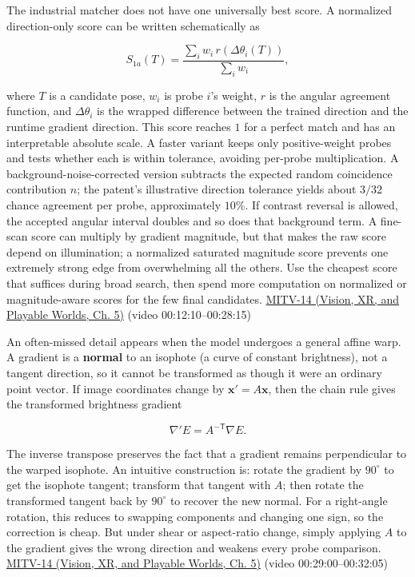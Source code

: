 \hypertarget{04-visual-computing-ii-ch030-the-score-is-a-design-choice-and-affine-transforms-act-on-normals}{}

The industrial matcher does not have one universally best score. A normalized direction-only score can be written schematically as

\[
S_{1a}(T)=\frac{\sum_i w_i\,r(\Delta\theta_i(T))}{\sum_i w_i},
\]

where \(T\) is a candidate pose, \(w_i\) is probe \(i\)'s weight, \(r\) is the angular agreement function, and \(\Delta\theta_i\) is the wrapped difference between the trained direction and the runtime gradient direction. This score reaches \(1\) for a perfect match and has an interpretable absolute scale. A faster variant keeps only positive-weight probes and tests whether each is within tolerance, avoiding per-probe multiplication. A background-noise-corrected version subtracts the expected random coincidence contribution \(n\); the patent's illustrative direction tolerance yields about \(3/32\) chance agreement per probe, approximately \(10\%\). If contrast reversal is allowed, the accepted angular interval doubles and so does that background term. A fine-scan score can multiply by gradient magnitude, but that makes the raw score depend on illumination; a normalized saturated magnitude score prevents one extremely strong edge from overwhelming all the others. Use the cheapest score that suffices during broad search, then spend more computation on normalized or magnitude-aware scores for the few final candidates. \href{../07-Vision-XR-and-Playable-Worlds/main.pdf\#nameddest=04-visual-computing-ii-ch036-mitv-14---inspection-in-patquick-hough-transform-homography-position-determination-multi-scale}{MITV-14 (Vision, XR, and Playable Worlds, Ch. 5)} (video 00:12:10--00:28:15)

An often-missed detail appears when the model undergoes a general affine warp. A gradient is a \textbf{normal} to an isophote (a curve of constant brightness), not a tangent direction, so it cannot be transformed as though it were an ordinary point vector. If image coordinates change by \(\mathbf{x}'=A\mathbf{x}\), then the chain rule gives the transformed brightness gradient

\[
\nabla' E=A^{-\mathsf T}\nabla E.
\]

The inverse transpose preserves the fact that a gradient remains perpendicular to the warped isophote. An intuitive construction is: rotate the gradient by \(90^\circ\) to get the isophote tangent; transform that tangent with \(A\); then rotate the transformed tangent back by \(90^\circ\) to recover the new normal. For a right-angle rotation, this reduces to swapping components and changing one sign, so the correction is cheap. But under shear or aspect-ratio change, simply applying \(A\) to the gradient gives the wrong direction and weakens every probe comparison. \href{../07-Vision-XR-and-Playable-Worlds/main.pdf\#nameddest=04-visual-computing-ii-ch036-mitv-14---inspection-in-patquick-hough-transform-homography-position-determination-multi-scale}{MITV-14 (Vision, XR, and Playable Worlds, Ch. 5)} (video 00:29:00--00:32:05)


